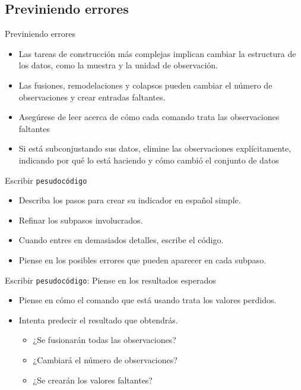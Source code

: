 \documentclass[10pt, aspectratio=169, compress]{beamer}
\begin{document}
\subsection{Previniendo errores}
\begin{frame}{Previniendo errores}
	\begin{itemize}
		\item Las tareas de construcción más complejas implican cambiar la estructura de los datos, como la muestra y la unidad de observación.
		\item Las fusiones, remodelaciones y colapsos pueden cambiar el número de observaciones y crear entradas faltantes.
		\item Asegúrese de leer acerca de cómo cada comando trata las observaciones faltantes
		\item Si está subconjustando sus datos, elimine las observaciones explícitamente, indicando por qué lo está haciendo y cómo cambió el conjunto de datos
	\end{itemize}
\end{frame}
\begin{frame}{Escribir \texttt{pesudocódigo}}
	\begin{itemize}
		\item Describa los pasos para crear su indicador en español simple.
		\item Refinar los subpasos involucrados.
		\item Cuando entres en demasiados detalles, escribe el código.
		\item Piense en los posibles errores que pueden aparecer en cada subpaso.
	\end{itemize}
\end{frame}
\begin{frame}{Escribir \texttt{pesudocódigo}: Piense en los resultados esperados}
	\begin{itemize}
		\item Piense en cómo el comando que está usando trata los valores perdidos.
		\item Intenta predecir el resultado que obtendrás.
		\begin{itemize}
			\item ¿Se fusionarán todas las observaciones?
			\item ¿Cambiará el número de observaciones?
			\item ¿Se crearán los valores faltantes?
		\end{itemize}
	\end{itemize}
\end{frame}
\end{document}
